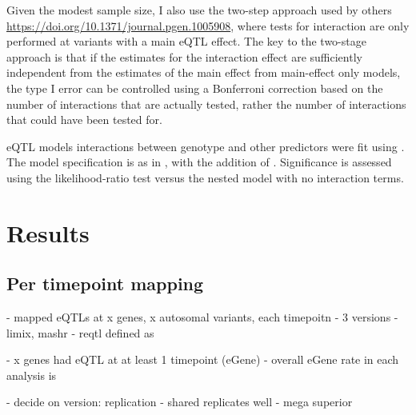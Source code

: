 Given the modest sample size, I also use the two-step approach used by others\autocite{westra2015CellSpecificEQTL, kim-hellmuth2017GeneticRegulatoryEffects, davenport2018DiscoveringVivoCytokineeQTL} \url{https://doi.org/10.1371/journal.pgen.1005908},
where tests for interaction are only performed at variants with a main \gls{eQTL} effect.
%
%
The key to the two-stage approach is that if the estimates for the interaction effect are sufficiently independent from the estimates of the main effect from main-effect only models,
the type I error can be controlled using a Bonferroni correction based on the number of interactions that are actually tested, rather the number of interactions that could have been tested for\autocite{kooperberg2008IncreasingPowerIdentifying, }.

\gls{eQTL} models interactions between genotype and other predictors were fit using .
The model specification is as in , with the addition of .
Significance is assessed using the likelihood-ratio test versus the nested model with no interaction terms.

\section{Results}

\subsection{Per timepoint mapping}

- mapped eQTLs at x genes, x autosomal variants, each timepoitn
- 3 versions
- limix, mashr
- reqtl defined as

- x genes had eQTL at at least 1 timepoint (eGene)
- overall eGene rate in each analysis is

- decide on version: replication
- shared replicates well
- mega superior

